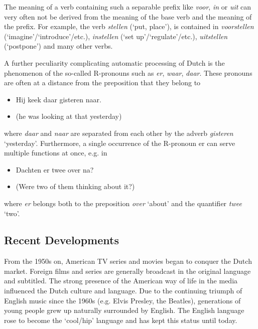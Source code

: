 \documentclass[]{../../metanetpaper}
\begin{document}
\begin{multicols}{2}
    The meaning of a verb containing such a separable prefix like \emph{voor}, \emph{in} or \emph{uit} can very often not be derived from the meaning of the base verb and the meaning of the prefix. For example, the verb \emph{stellen} (`put, place'), is contained in \emph{voorstellen} (`imagine'/`introduce'/etc.), \emph{instellen} (`set up'/`regulate'/etc.), \emph{uitstellen} (`postpone') and many other verbs.


    A further peculiarity complicating automatic processing of Dutch is the phenomenon of the so-called R-pronouns such as \emph{er}, \emph{waar}, \emph{daar}. These pronouns are often at a distance from the preposition that they belong to

\begin{itemize}
\item Hij keek daar gisteren naar.
    \item (he was looking at that yesterday)
\end{itemize}

    where \textit{daar} and \textit{naar} are separated from each other by the adverb \textit{gisteren} `yesterday'.
    Furthermore, a single occurrence of the R-pronoun er can serve multiple functions at once, e.g. in\\

\begin{itemize}
\item Dachten er twee over na?
\item (Were two of them thinking about it?)
\end{itemize}



    where \textit{er} belongs both to the preposition \textit{over} `about' and the quantifier \textit{twee} `two'.

\subsection{Recent Developments}

From the 1950s on, American TV series and movies began to conquer the Dutch market. Foreign films and series are generally broadcast in the original language and subtitled. The strong presence of the American way of life in the media influenced the Dutch culture and language.  Due to the continuing triumph of English music since the 1960s (e.g. Elvis Presley, the Beatles), generations of young people grew up naturally surrounded by English. The English language rose to become the `cool/hip' language and has kept this status until today.


\end{multicols}
\end{document}
